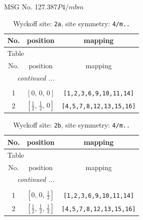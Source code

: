 \documentclass[fleqn,8pt]{jsarticle}
\begin{document}
\setcounter{MaxMatrixCols}{32}

\renewcommand{\tablename}{Table~}
\renewcommand{\figurename}{Figure~}
\begin{center}
\LARGE
MSG No. 127.387\quad$P4/mbm$
\end{center}
\renewcommand{\arraystretch}{1.2}
\begin{longtable}{ccc}
\caption{Wyckoff site: {\tt 2a}, site symmetry: {\tt 4/m..}}
 \\
 \hline \hline
No. & position & mapping \\ \hline \endfirsthead

\multicolumn{2}{l}{\tablename\ \thetable{}} \\
 \hline \hline
No. & position & mapping \\ \hline \endhead

 \hline \hline
\multicolumn{2}{r}{\footnotesize\it continued ...} \\ \endfoot

 \hline \hline
\multicolumn{2}{r}{} \\ \endlastfoot

1 & $\left[ 0,\, 0,\, 0 \right]$ & {\tt [1,2,3,6,9,10,11,14]} \\ \hline
2 & $\left[ \frac{1}{2},\, \frac{1}{2},\, 0 \right]$ & {\tt [4,5,7,8,12,13,15,16]} \\
\end{longtable}
\renewcommand{\arraystretch}{1.2}
\begin{longtable}{ccc}
\caption{Wyckoff site: {\tt 2b}, site symmetry: {\tt 4/m..}}
 \\
 \hline \hline
No. & position & mapping \\ \hline \endfirsthead

\multicolumn{2}{l}{\tablename\ \thetable{}} \\
 \hline \hline
No. & position & mapping \\ \hline \endhead

 \hline \hline
\multicolumn{2}{r}{\footnotesize\it continued ...} \\ \endfoot

 \hline \hline
\multicolumn{2}{r}{} \\ \endlastfoot

1 & $\left[ 0,\, 0,\, \frac{1}{2} \right]$ & {\tt [1,2,3,6,9,10,11,14]} \\ \hline
2 & $\left[ \frac{1}{2},\, \frac{1}{2},\, \frac{1}{2} \right]$ & {\tt [4,5,7,8,12,13,15,16]} \\
\end{longtable}
\end{document}
